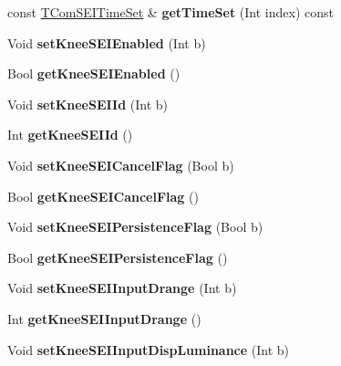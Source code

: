\begin{DoxyCompactItemize}
const \hyperlink{struct_t_com_s_e_i_time_set}{T\+Com\+S\+E\+I\+Time\+Set} \& {\bfseries get\+Time\+Set} (Int index) const
\item 
\mbox{\label{class_t_enc_cfg_a8db8adf2b9e67d74bda954388f2437af}} 
Void {\bfseries set\+Knee\+S\+E\+I\+Enabled} (Int b)
\item 
\mbox{\label{class_t_enc_cfg_a12a94504a2e9561a703361041d41394d}} 
Bool {\bfseries get\+Knee\+S\+E\+I\+Enabled} ()
\item 
\mbox{\label{class_t_enc_cfg_a880732082d0ee757916396d8b1c0ddad}} 
Void {\bfseries set\+Knee\+S\+E\+I\+Id} (Int b)
\item 
\mbox{\label{class_t_enc_cfg_ace2cf734962b809916bc9f103b0c2df0}} 
Int {\bfseries get\+Knee\+S\+E\+I\+Id} ()
\item 
\mbox{\label{class_t_enc_cfg_af44d6860b94ded77a9874c6df675bcb5}} 
Void {\bfseries set\+Knee\+S\+E\+I\+Cancel\+Flag} (Bool b)
\item 
\mbox{\label{class_t_enc_cfg_a448db81e4c7f820dce47a51f6188f45f}} 
Bool {\bfseries get\+Knee\+S\+E\+I\+Cancel\+Flag} ()
\item 
\mbox{\label{class_t_enc_cfg_a89ca0134ad2741005c82813a409dbcf3}} 
Void {\bfseries set\+Knee\+S\+E\+I\+Persistence\+Flag} (Bool b)
\item 
\mbox{\label{class_t_enc_cfg_aa82e4992f5277fd1f0a19bd4891cca27}} 
Bool {\bfseries get\+Knee\+S\+E\+I\+Persistence\+Flag} ()
\item 
\mbox{\label{class_t_enc_cfg_ab7c1faaae8d447faad868950cf3cf7ad}} 
Void {\bfseries set\+Knee\+S\+E\+I\+Input\+Drange} (Int b)
\item 
\mbox{\label{class_t_enc_cfg_a2d495c18532dde67797b3863ef1adc07}} 
Int {\bfseries get\+Knee\+S\+E\+I\+Input\+Drange} ()
\item 
\mbox{\label{class_t_enc_cfg_aa795d17f2ed9c79c9081b1ebea55b63b}} 
Void {\bfseries set\+Knee\+S\+E\+I\+Input\+Disp\+Luminance} (Int b)

\end{DoxyCompactItemize}
